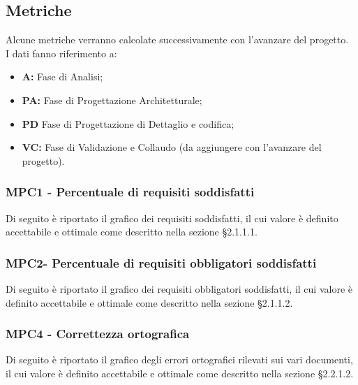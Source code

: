 \subsection{Metriche}
Alcune metriche verranno calcolate successivamente con l'avanzare del progetto.\\

I dati fanno riferimento a:
\begin{itemize}
	\item \textbf{A:} Fase di Analisi;
	\item \textbf{PA:} Fase di Progettazione Architetturale;
	\item \textbf{PD} Fase di Progettazione di Dettaglio e codifica;
	\item \textbf{VC: } Fase di Validazione e Collaudo (da aggiungere con l'avanzare del progetto).
\end{itemize}

\subsubsection{MPC1 - Percentuale di requisiti soddisfatti}
Di seguito è riportato il grafico dei requisiti soddisfatti, il cui valore è definito accettabile e ottimale come descritto nella sezione §2.1.1.1.\\

\subsubsection{MPC2- Percentuale di requisiti obbligatori soddisfatti}
Di seguito è riportato il grafico dei requisiti obbligatori soddisfatti, il cui valore è definito accettabile e ottimale come descritto nella sezione §2.1.1.2.\\



\subsubsection{MPC4 - Correttezza ortografica}
Di seguito è riportato il grafico degli errori ortografici rilevati sui vari documenti, il cui valore è definito accettabile e ottimale come descritto nella sezione §2.2.1.2.\\

